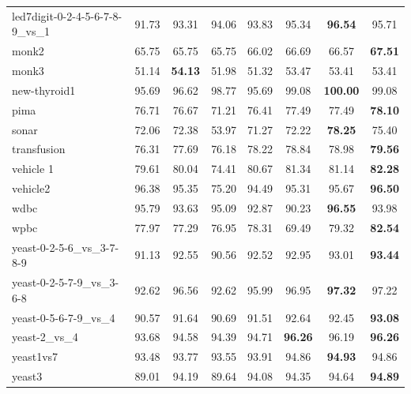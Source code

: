\begin{table}[!p]
{\begin{tabular}{lccccccc}
led7digit-0-2-4-5-6-7-8-9\_vs\_1 & 91.73 & 93.31 & 94.06 & 93.83 & 95.34 & \textbf{96.54} & 95.71 \\
monk2 & 65.75 & 65.75 & 65.75 & 66.02 & 66.69 & 66.57 & \textbf{67.51} \\
monk3 & 51.14 & \textbf{54.13} & 51.98 & 51.32 & 53.47 & 53.41 & 53.41 \\
new-thyroid1 & 95.69 & 96.62 & 98.77 & 95.69 & 99.08 & \textbf{100.00} & 99.08 \\
pima & 76.71 & 76.67 & 71.21 & 76.41 & 77.49 & 77.49 & \textbf{78.10} \\
sonar & 72.06 & 72.38 & 53.97 & 71.27 & 72.22 & \textbf{78.25} & 75.40 \\
transfusion & 76.31 & 77.69 & 76.18 & 78.22 & 78.84 & 78.98 & \textbf{79.56} \\
vehicle 1 & 79.61 & 80.04 & 74.41 & 80.67 & 81.34 & 81.14 & \textbf{82.28} \\
vehicle2 & 96.38 & 95.35 & 75.20 & 94.49 & 95.31 & 95.67 & \textbf{96.50} \\
wdbc & 95.79 & 93.63 & 95.09 & 92.87 & 90.23 & \textbf{96.55} & 93.98 \\
wpbc & 77.97 & 77.29 & 76.95 & 78.31 & 69.49 & 79.32 & \textbf{82.54} \\
yeast-0-2-5-6\_vs\_3-7-8-9 & 91.13 & 92.55 & 90.56 & 92.52 & 92.95 & 93.01 & \textbf{93.44} \\
yeast-0-2-5-7-9\_vs\_3-6-8 & 92.62 & 96.56 & 92.62 & 95.99 & 96.95 & \textbf{97.32} & 97.22 \\
yeast-0-5-6-7-9\_vs\_4 & 90.57 & 91.64 & 90.69 & 91.51 & 92.64 & 92.45 & \textbf{93.08} \\
yeast-2\_vs\_4 & 93.68 & 94.58 & 94.39 & 94.71 & \textbf{96.26} & 96.19 & \textbf{96.26} \\
yeast1vs7 & 93.48 & 93.77 & 93.55 & 93.91 & 94.86 & \textbf{94.93} & 94.86 \\
yeast3 & 89.01 & 94.19 & 89.64 & 94.08 & 94.35 & 94.64 & \textbf{94.89} \\
\bottomrule
\end{tabular}}
\end{table}
